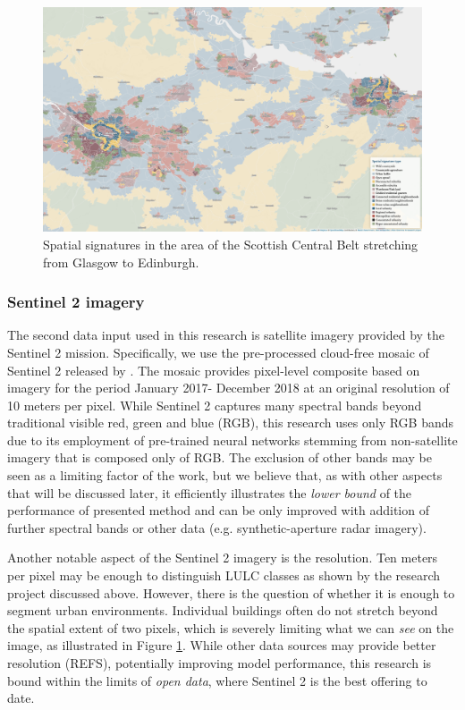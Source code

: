\begin{figure}
    \centering
    \includegraphics[width=.8\linewidth]{fig/signatures_scotland.png}
    \caption{Spatial signatures in the area of the Scottish Central Belt stretching from Glasgow to Edinburgh.}
    \label{fig:signatures}
\end{figure}



\subsubsection{Sentinel 2 imagery}


The second data input used in this research is satellite imagery provided by the
Sentinel 2 mission. Specifically, we use the pre-processed cloud-free mosaic of Sentinel
2 released by \cite{CORBANE2020105737}.
The mosaic provides pixel-level composite based on imagery for the period January 2017-
December 2018 at an original resolution of 10 meters per pixel. While Sentinel 2
captures many spectral bands beyond traditional visible red, green and blue (RGB), this
research uses only RGB bands due to its employment of pre-trained neural networks
stemming from non-satellite imagery that is composed only of RGB. The exclusion of other
bands may be seen as a limiting factor of the work, but we believe that, as with other
aspects that will be discussed later, it efficiently illustrates the \textit{lower
bound} of the performance of presented method and can be only improved with addition of
further spectral bands or other data (e.g. synthetic-aperture radar imagery).

Another notable aspect of the Sentinel 2 imagery is the resolution. Ten meters per pixel
may be enough to distinguish LULC classes as shown by the research project discussed
above. However, there is the question of whether it is enough to segment urban environments.
Individual buildings often do not stretch beyond the spatial extent of two pixels, which
is severely limiting what we can \textit{see} on the image, as illustrated in Figure
\ref{fig:signatures}. While other data sources may provide better resolution (REFS),
potentially improving model performance, this research is bound within the
limits of \textit{open data}, where Sentinel 2 is the best offering to date.


